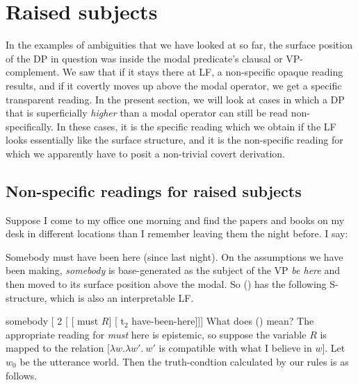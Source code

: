 \section{Raised subjects}
\label{sec:raised}

In the examples of ambiguities that we have looked at so far, the surface
position of the DP in question was inside the modal predicate's clausal or
VP-complement. We saw that if it stays there at LF, a non-specific opaque
reading results, and if it covertly moves up above the modal operator, we get a
specific transparent reading. In the present section, we will look at cases in
which a DP that is superficially \emph{higher} than a modal operator can still
be read non-specifically. In these cases, it is the specific reading which we
obtain if the LF looks essentially like the surface structure, and it is the
non-specific reading for which we apparently have to posit a non-trivial covert
derivation.

\subsection{Non-specific readings for raised subjects}

Suppose I come to my office one morning and find the papers and books on my desk
in different locations than I remember leaving them the night before. I say:

\ex \label{some} Somebody must have been here (since last night).\xe
%
On the assumptions we have been making, \emph{somebody} is base-generated as the
subject of the VP \emph{be here} and then moved to its surface position above
the modal. So (\lastx) has the following S-structure, which is also an
interpretable LF.

\ex \label{dere} somebody [ 2 [ [ must $R$] [ t$_2$ have-been-here]]] \xe
%
What does (\lastx) mean? The appropriate reading for \emph{must} here is
epistemic, so suppose the variable $R$ is mapped to the relation $\bigl[\lambda
w.\lambda w'.\ w'$ is compatible with what I believe in $w\bigr]$. Let $w_{0}$
be the utterance world. Then the truth-condtion calculated by our rules is as
follows.

